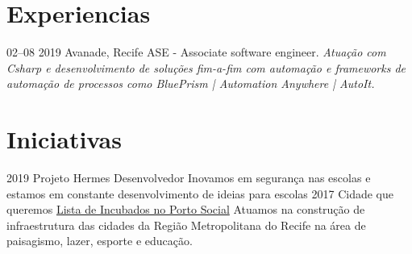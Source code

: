 \documentclass[]{friggeri-cv}
\begin{document}
\section{Experiencias}

\begin{entrylist}
  \entry
    {02–08 2019}
    {Avanade, Recife}
    {ASE - Associate software engineer.}
    {\emph{Atuação com Csharp e desenvolvimento de soluções fim-a-fim com automação e frameworks de automação de processos como BluePrism | Automation Anywhere | AutoIt.}}
\end{entrylist}

\section{Iniciativas}

\begin{entrylist}
  \entry
    {2019}
    {Projeto Hermes}
    {{Desenvolvedor}}
    {Inovamos em segurança nas escolas e estamos em constante desenvolvimento de ideias para escolas }
    \entry
    {2017}
    {Cidade que queremos}
    {\href{http://www.portosocial.com.br/incubados/}{Lista de Incubados no Porto Social}}
    {Atuamos na construção de infraestrutura das cidades da Região Metropolitana do Recife na área de paisagismo, lazer, esporte e educação.}
\end{entrylist}
\end{document}
